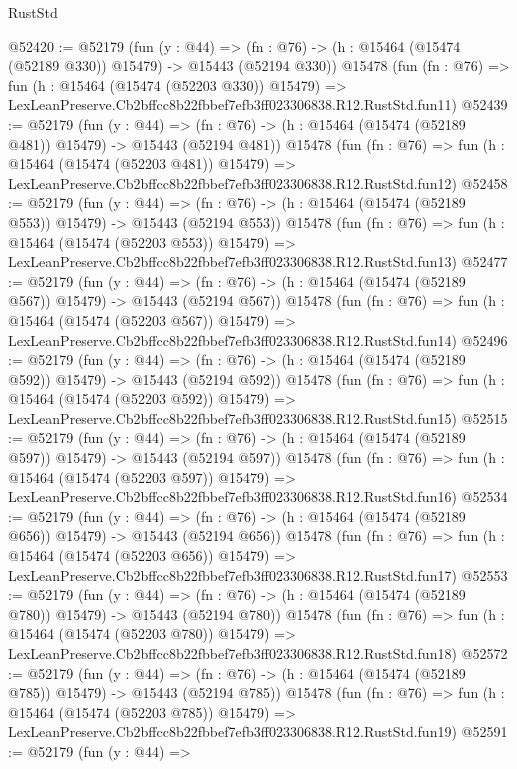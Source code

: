 \begin{lexlean}{RustStd}
\begin{coremodule}
@52420 := @52179
    (fun (y : @44) =>
    (fn : @76) -> (h : @15464 (@15474 (@52189 @330)) @15479) -> @15443 (@52194 @330))
    @15478
    (fun (fn : @76) =>
    fun (h : @15464 (@15474 (@52203 @330)) @15479) =>
    LexLeanPreserve.Cb2bffcc8b22fbbef7efb3ff023306838.R12.RustStd.fun11)
@52439 := @52179
    (fun (y : @44) =>
    (fn : @76) -> (h : @15464 (@15474 (@52189 @481)) @15479) -> @15443 (@52194 @481))
    @15478
    (fun (fn : @76) =>
    fun (h : @15464 (@15474 (@52203 @481)) @15479) =>
    LexLeanPreserve.Cb2bffcc8b22fbbef7efb3ff023306838.R12.RustStd.fun12)
@52458 := @52179
    (fun (y : @44) =>
    (fn : @76) -> (h : @15464 (@15474 (@52189 @553)) @15479) -> @15443 (@52194 @553))
    @15478
    (fun (fn : @76) =>
    fun (h : @15464 (@15474 (@52203 @553)) @15479) =>
    LexLeanPreserve.Cb2bffcc8b22fbbef7efb3ff023306838.R12.RustStd.fun13)
@52477 := @52179
    (fun (y : @44) =>
    (fn : @76) -> (h : @15464 (@15474 (@52189 @567)) @15479) -> @15443 (@52194 @567))
    @15478
    (fun (fn : @76) =>
    fun (h : @15464 (@15474 (@52203 @567)) @15479) =>
    LexLeanPreserve.Cb2bffcc8b22fbbef7efb3ff023306838.R12.RustStd.fun14)
@52496 := @52179
    (fun (y : @44) =>
    (fn : @76) -> (h : @15464 (@15474 (@52189 @592)) @15479) -> @15443 (@52194 @592))
    @15478
    (fun (fn : @76) =>
    fun (h : @15464 (@15474 (@52203 @592)) @15479) =>
    LexLeanPreserve.Cb2bffcc8b22fbbef7efb3ff023306838.R12.RustStd.fun15)
@52515 := @52179
    (fun (y : @44) =>
    (fn : @76) -> (h : @15464 (@15474 (@52189 @597)) @15479) -> @15443 (@52194 @597))
    @15478
    (fun (fn : @76) =>
    fun (h : @15464 (@15474 (@52203 @597)) @15479) =>
    LexLeanPreserve.Cb2bffcc8b22fbbef7efb3ff023306838.R12.RustStd.fun16)
@52534 := @52179
    (fun (y : @44) =>
    (fn : @76) -> (h : @15464 (@15474 (@52189 @656)) @15479) -> @15443 (@52194 @656))
    @15478
    (fun (fn : @76) =>
    fun (h : @15464 (@15474 (@52203 @656)) @15479) =>
    LexLeanPreserve.Cb2bffcc8b22fbbef7efb3ff023306838.R12.RustStd.fun17)
@52553 := @52179
    (fun (y : @44) =>
    (fn : @76) -> (h : @15464 (@15474 (@52189 @780)) @15479) -> @15443 (@52194 @780))
    @15478
    (fun (fn : @76) =>
    fun (h : @15464 (@15474 (@52203 @780)) @15479) =>
    LexLeanPreserve.Cb2bffcc8b22fbbef7efb3ff023306838.R12.RustStd.fun18)
@52572 := @52179
    (fun (y : @44) =>
    (fn : @76) -> (h : @15464 (@15474 (@52189 @785)) @15479) -> @15443 (@52194 @785))
    @15478
    (fun (fn : @76) =>
    fun (h : @15464 (@15474 (@52203 @785)) @15479) =>
    LexLeanPreserve.Cb2bffcc8b22fbbef7efb3ff023306838.R12.RustStd.fun19)
@52591 := @52179
    (fun (y : @44) =>

\end{coremodule}
\end{lexlean}
